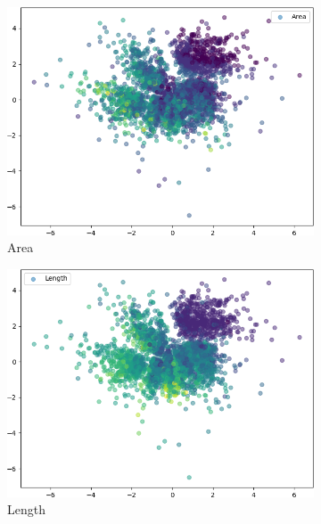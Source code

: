 \documentclass{beamer}
\begin{document}
\begin{frame}
\begin{figure}
\hfill
\begin{subfigure}{.32\textwidth}
\includegraphics[width=\textwidth]{images/latent_spaces/mnist/vae/embeddings_mu_2.png}
\caption{Area}
\end{subfigure}
\hfill
\begin{subfigure}{.24\textwidth}
\includegraphics[width=\textwidth]{images/latent_spaces/mnist/vae/embeddings_mu_3.png}
\caption{Length}
\end{subfigure}
\hfill
\begin{subfigure}{.24\textwidth}

\end{subfigure}
\end{figure}
\end{frame}
\end{document}
